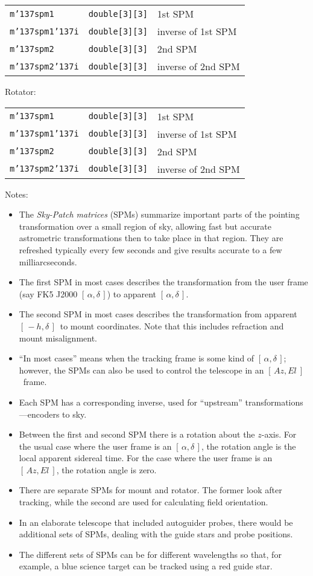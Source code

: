 \documentclass[12pt,fleqn,twoside]{article}
\renewcommand{\_}{{\tt\char'137}}     %
\newcommand{\radec}     {$[\,\alpha,\delta\,]$}
\newcommand{\mhadec}     {$[\,-h,\delta\,]$}
\newcommand{\azel}      {$[\,Az,El~]$}
\newcommand{\notelist}  {\goodbreak \vspace{1ex} Notes:
                        \vspace{-3ex}}
\begin{document}
\begin{tabular}{lll}
{\tt m\_spm1   } & {\tt double[3][3]} & 1st SPM \\
{\tt m\_spm1\_i} & {\tt double[3][3]} & inverse of 1st SPM \\
{\tt m\_spm2   } & {\tt double[3][3]} & 2nd SPM \\
{\tt m\_spm2\_i} & {\tt double[3][3]} & inverse of 2nd SPM \\
\end{tabular}

Rotator:

\begin{tabular}{lll}
{\tt m\_spm1   } & {\tt double[3][3]} & 1st SPM \\
{\tt m\_spm1\_i} & {\tt double[3][3]} & inverse of 1st SPM \\
{\tt m\_spm2   } & {\tt double[3][3]} & 2nd SPM \\
{\tt m\_spm2\_i} & {\tt double[3][3]} & inverse of 2nd SPM \\
\end{tabular}

\notelist
\begin{itemize}
\item The {\it Sky-Patch matrices}\/ (SPMs) summarize important parts of the
      pointing transformation over a small region of sky, allowing fast
      but accurate astrometric transformations then to take
      place in that region.  They are refreshed typically every few seconds
      and give results accurate to a few milliarcseconds.
\item The first SPM in most cases describes the transformation from
      the user frame (say FK5 J2000 \radec)  to apparent \radec.
\item The second SPM in most cases describes the transformation
      from apparent \mhadec\ to mount coordinates.  Note that this
      includes refraction and mount misalignment.
\item ``In most cases'' means when the tracking frame is some kind
      of \radec;  however, the SPMs can also be used to control the
      telescope in an \azel\ frame.
\item Each SPM has a corresponding inverse, used for ``upstream''
      transformations---encoders to sky.
\item Between the first and second SPM there is a rotation about
      the $z$-axis. For the usual case where the user frame is an
      \radec, the rotation angle is the local apparent sidereal
      time.  For the case where the user frame is an \azel, the
      rotation angle is zero.
\item There are separate SPMs for mount and rotator.  The former look
      after tracking, while the second are used for calculating field
      orientation.
\item In an elaborate telescope that included autoguider probes,
      there would be additional sets of SPMs, dealing with the
      guide stars and probe positions.
\item The different sets of SPMs can be for different wavelengths so
      that, for example, a blue science target can be tracked using a
      red guide star.
\end{itemize}
\end{document}
